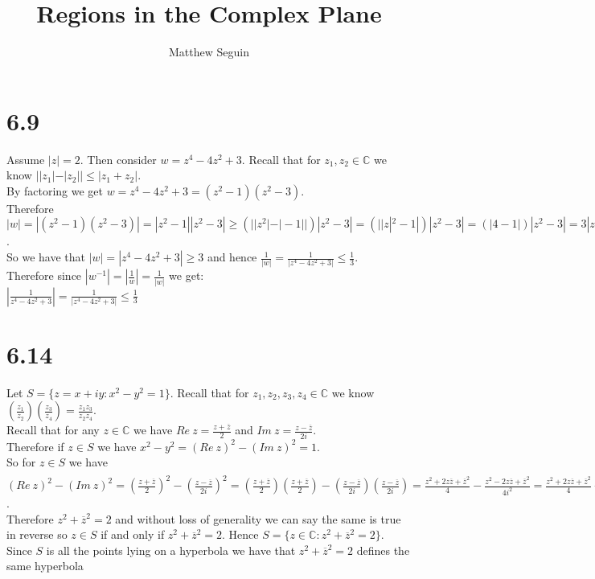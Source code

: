 \documentclass{article}
\title{Regions in the Complex Plane}
\author{Matthew Seguin}
\date{}
\begin{document}
\maketitle

\section*{6.9}
\begin{center}
    \doublespacing
    Assume $|z| = 2$. Then consider $w = z^4 - 4z^2 + 3$. Recall that for $z_1, z_2\in\mathbb{C}$ we know $||z_1| - |z_2||\leq |z_1 + z_2|$.
    \\By factoring we get $w = z^4 - 4z^2 + 3 = (z^2 - 1)(z^2 - 3)$.
    \\Therefore $|w| = |(z^2 - 1)(z^2 - 3)| = |z^2 - 1||z^2 - 3|\geq (||z^2| - |-1||)|z^2 - 3| = (||z|^2 - 1|)|z^2 - 3| = (|4 - 1|)|z^2 - 3| = 3|z^2 - 3|\geq 3||z^2| - |-3|| = 3||z|^2 - 3| = 3|4 - 3| = 3$.
    \\So we have that $|w| = |z^4 - 4z^2 + 3|\geq 3$ and hence $\frac{1}{|w|} =\frac{1}{|z^4 - 4z^2 + 3|}\leq\frac{1}{3}$.
    \\Therefore since $|w^{-1}| = |\frac{1}{w}| =\frac{1}{|w|}$ we get:
    \\$|\frac{1}{z^4 - 4z^2 + 3}| =\frac{1}{|z^4 - 4z^2 + 3|}\leq\frac{1}{3}$ \qedsymbol
\end{center}


\section*{6.14}
\begin{center}
    \doublespacing
    Let $S =\{z = x + iy: x^2 - y^2 = 1\}$. Recall that for $z_1, z_2, z_3, z_4\in\mathbb{C}$ we know $(\frac{z_1}{z_2})(\frac{z_3}{z_4}) =\frac{z_1 z_3}{z_2 z_4}$.
    \\Recall that for any $z\in\mathbb{C}$ we have $Re\:z =\frac{z +\overline{z}}{2}$ and $Im\:z =\frac{z -\overline{z}}{2i}$.
    \\Therefore if $z\in S$ we have $x^2 - y^2 = (Re\:z)^2 - (Im\:z)^2 = 1$.
    \\So for $z\in S$ we have $(Re\:z)^2 - (Im\:z)^2 = (\frac{z +\overline{z}}{2})^2 - (\frac{z -\overline{z}}{2i})^2 = (\frac{z +\overline{z}}{2})(\frac{z +\overline{z}}{2}) - (\frac{z -\overline{z}}{2i})(\frac{z -\overline{z}}{2i}) =\frac{z^2 + 2z\overline{z} +\overline{z}^2}{4} -\frac{z^2 - 2z\overline{z} +\overline{z}^2}{4i^2} =\frac{z^2 + 2z\overline{z} +\overline{z}^2}{4} +\frac{z^2 - 2z\overline{z} +\overline{z}^2}{4} =\frac{2(z^2 +\overline{z}^2)}{4} =\frac{z^2 +\overline{z}^2}{2} = 1$.
    \\Therefore $z^2 +\overline{z}^2 = 2$ and without loss of generality we can say the same is true in reverse so $z\in S$ if and only if $z^2 +\overline{z}^2 = 2$. Hence $S =\{z\in\mathbb{C}: z^2 +\overline{z}^2 = 2\}$.
    \\Since $S$ is all the points lying on a hyperbola we have that $z^2 +\overline{z}^2 = 2$ defines the same hyperbola \qedsymbol
\end{center}
\end{document}
